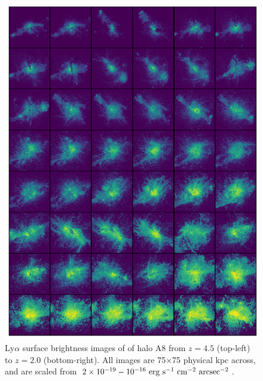 \begin{figure}
    \centering
    \includegraphics[width=\textwidth,keepaspectratio]{figures/rogues_A8.png}
    \caption{
        Ly$\alpha$ surface brightness images of of halo A8 from $z=4.5$ (top-left) to $z=2.0$ (bottom-right).
        All images are 75$\times$75 physical kpc across, and are scaled from $2\times10^{-19}-10^{-16}\ \rm{erg}\ \rm{s}^{-1}\ \rm{cm}^{-2}\ \rm{arcsec}^{-2}$.
    }
  \label{fig:rogues8}
\end{figure}


